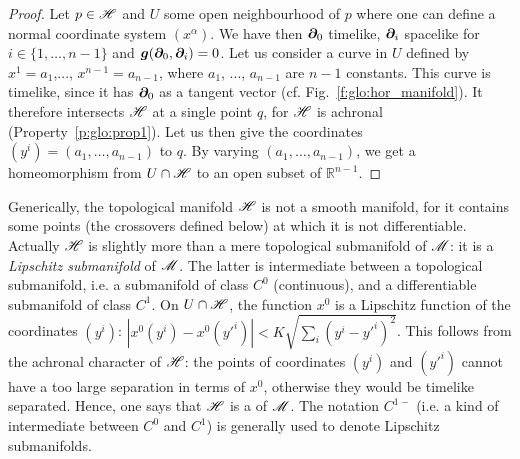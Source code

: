 \begin{proof}
Let $p\in\mathscr{H}$ and $U$ some open neighbourhood of $p$ where one can define
a normal coordinate system $(x^\alpha)$. We have then $\bm{\partial}_0$ timelike,
$\bm{\partial}_i$ spacelike for $i\in\{1,\ldots,n-1\}$ and $\bm{g}(\bm{\partial}_0, \bm{\partial}_i) = 0$.
Let us consider a curve in $U$ defined by $x^1 = a_1$,..., $x^{n-1} = a_{n-1}$,
where $a_1$, ..., $a_{n-1}$ are $n-1$ constants.
This curve is timelike, since it has $\bm{\partial}_0$ as a tangent vector
(cf. Fig.~\ref{f:glo:hor_manifold}).
It therefore intersects $\mathscr{H}$ at a single point $q$, for $\mathscr{H}$ is achronal
(Property~\ref{p:glo:prop1}).
Let us then give the coordinates $(y^i) = (a_1,\ldots,a_{n-1})$ to $q$.
By varying $(a_1,\ldots,a_{n-1})$, we get a homeomorphism from $U\cap\mathscr{H}$
to an open subset of $\mathbb{R}^{n-1}$.
\end{proof}

\begin{remark}
Generically, the topological manifold $\mathscr{H}$ is not a smooth manifold, for it
contains some points (the crossovers defined below) at which it is not differentiable.
Actually $\mathscr{H}$ is slightly more than a mere topological submanifold of $\mathscr{M}$: it is a
\emph{Lipschitz submanifold} of $\mathscr{M}$. The latter is
intermediate between a topological submanifold, i.e.
a submanifold of class $C^0$ (continuous), and a differentiable submanifold of
class $C^1$. On $U\cap\mathscr{H}$, the function $x^0$ is a Lipschitz function
of the coordinates $(y^i)$: $\left|x^0(y^i) - x^0({y'}^i)\right| < K \sqrt{\sum_i (y^i - {y'}^i)^2}$.
This follows from the achronal character of $\mathscr{H}$: the points of coordinates
$(y^i)$ and $({y'}^i)$ cannot have a too large separation in terms of $x^0$,
otherwise they would be timelike separated.
Hence, one says that $\mathscr{H}$ is a  of $\mathscr{M}$. The notation $C^{1-}$ (i.e. a kind of intermediate between
$C^0$ and $C^1$) is generally used to denote Lipschitz submanifolds.
\end{remark}

